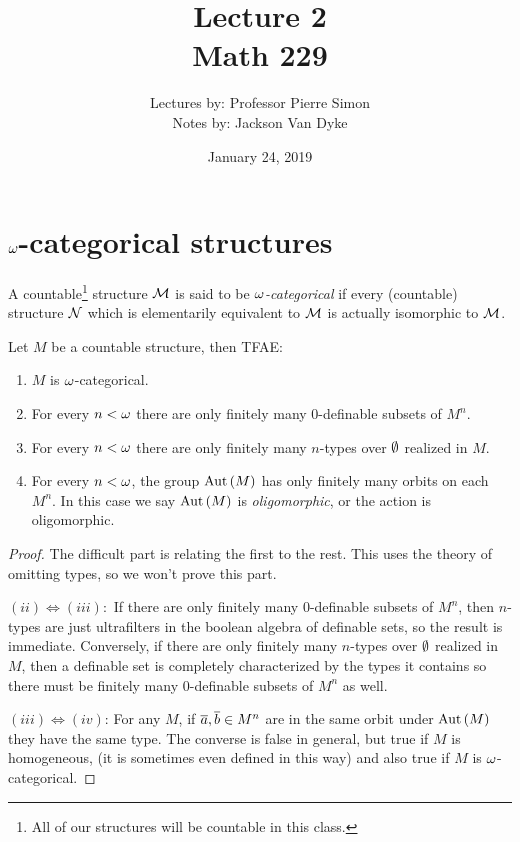 \documentclass{amsart}
\begin{document}
\title{Lecture 2\\Math 229}
\author{Lectures by: Professor Pierre Simon\\Notes by: Jackson Van Dyke}
\date{January 24, 2019}
\maketitle

\section{\texorpdfstring{$\omega$}{Omega}-categorical structures}

\begin{defn}
A countable\footnote{All of our structures will be countable in this class.} 
structure $\mathcal{M}$ is said to be \emph{$\omega$-categorical}
if every (countable) structure $\mathcal{N}$ which is elementarily equivalent to $\mathcal{M}$ 
is actually isomorphic to $\mathcal{M}$.
\end{defn}

\begin{thm}
Let $M$ be a countable structure, then TFAE:
\begin{enumerate}[label=(\iii)]
\item $M$ is $\omega$-categorical.
\item For every $n < \omega$ there are only finitely many
$0$-definable subsets of $M^n$.
\item For every $n < \omega$ there are only finitely many $n$-types over $\emptyset$
realized in $M$.
\item For every $n < \omega$, the group $\operatorname{Aut}\left( M \right)$ has only finitely many orbits on each $M^n$.
In this case we say $\operatorname{Aut}\left( M \right)$ is \emph{oligomorphic}, or the action is oligomorphic.
\end{enumerate}
\end{thm}

\begin{proof}
The difficult part is relating the first to the rest.
This uses the theory of omitting types, so we won't prove this part.

$\left( ii \right)\iff \left( iii \right):$ If there are only finitely many $0$-definable subsets of $M^n$, 
then $n$-types are just ultrafilters in the boolean algebra of definable sets, 
so the result is immediate.
Conversely, if there are only finitely many $n$-types over $\emptyset$
realized in $M$, then a definable set is completely characterized by the
types it contains so there must be finitely many $0$-definable subsets
of $M^n$ as well.

$\left( iii \right)\iff \left( iv \right)$: 
For any $M$, if $\overline{a},\overline{b}\in M^n$ are in the same orbit under 
$\operatorname{Aut}\left( M \right)$ they have the same type.
The converse is false in general, but true if $M$ is homogeneous,
(it is sometimes even defined in this way)
and also true if $M$ is $\omega$-categorical.
\end{proof}
\end{document}
